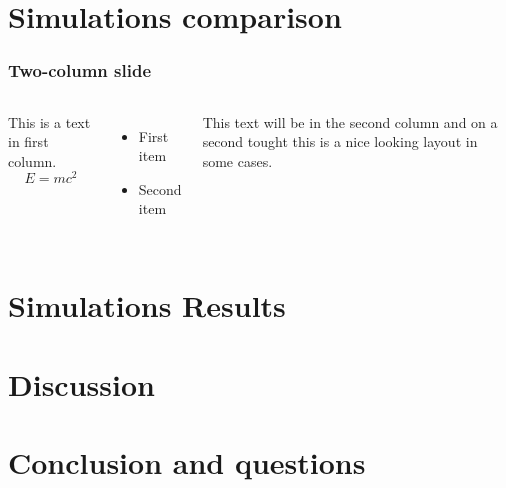 \documentclass{beamer}
\begin{document}
\section{Simulations comparison}

\begin{frame}
\frametitle{Two-column slide}

\begin{columns}

This is a text in first column.
$$E=mc^2$$
\begin{itemize}
\item First item
\item Second item
\end{itemize}

This text will be in the second column
and on a second tought this is a nice looking
layout in some cases.
\end{columns}
\end{frame}

\section{Simulations Results}

\begin{frame}


\end{frame}

\section{Discussion}

\begin{frame}


\end{frame}

\section{Conclusion and questions}

\begin{frame}


\end{frame}
\end{document}
